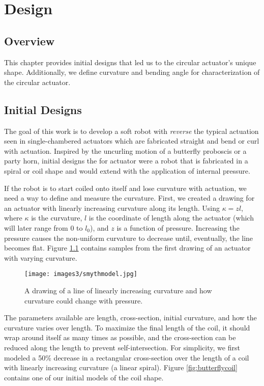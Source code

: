\chapter{Design}

\section{Overview}
This chapter provides initial designs that led us to the circular actuator's unique shape. Additionally, we define curvature and bending angle for characterization of the circular actuator. 

\section{Initial Designs}

The goal of this work is to develop a soft robot with \emph{reverse} the typical actuation seen in single-chambered actuators which are fabricated straight and bend or curl with actuation. Inspired by the uncurling motion of a butterfly proboscis or a party horn, initial designs the for actuator were a robot that is fabricated in a spiral or coil shape and would extend with the application of internal pressure. 

If the robot is to start coiled onto itself and lose curvature with actuation, we need a way to define and measure the curvature. First, we created a drawing for an actuator with linearly increasing curvature along its length. Using $\kappa = zl$, where $\kappa$ is the curvature, $l$ is the coordinate of length along the actuator (which will later range from 0 to $l_0$), and $z$ is a function of pressure. Increasing the pressure causes the non-uniform curvature to decrease until, eventually, the line becomes flat. Figure \ref{fig:smythmodel} contains samples from the first drawing of an actuator with varying curvature. 

\begin{figure}[ht]
    \centering
    \texttt{[image: images3/smythmodel.jpg]}
    \caption{A drawing of a line of linearly increasing curvature and how curvature could change with pressure.}
    \label{fig:smythmodel}
\end{figure}

The parameters available are length, cross-section, initial curvature, and how the curvature varies over length. To maximize the final length of the coil, it should wrap around itself as many times as possible, and the cross-section can be reduced along the length to prevent self-intersection. For simplicity, we first modeled a 50\% decrease in a rectangular cross-section over the length of a coil with linearly increasing curvature (a linear spiral). Figure \ref{fig:butterflycoil} contains one of our initial models of the coil shape. 

